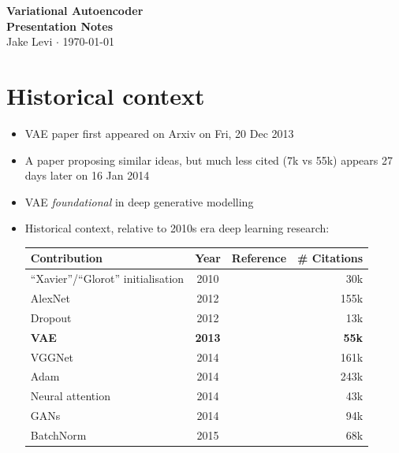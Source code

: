 \documentclass{article}
\begin{document}
\begin{center}
    \doublespacing
    \textbf{\LARGE Variational Autoencoder \\ Presentation Notes} \\
    Jake Levi $\cdot$ \today
\end{center}

\tableofcontents

\newpage
\section{Historical context}

\begin{itemize}
    \item VAE paper \cite{kingma2013auto} first appeared on Arxiv on Fri, 20 Dec 2013
    \item A paper proposing similar ideas, but much less cited (7k vs 55k) appears 27 days later on 16 Jan 2014 \cite{rezende2014stochastic}
    \item VAE \emph{foundational} in deep generative modelling
    \item Historical context, relative to 2010s era deep learning research:
    \begin{center}
        \begin{tabular}{l c l r}
            \hline
            \textbf{Contribution} & \textbf{Year} & \textbf{Reference} & \textbf{\# Citations} \\
            \hline
            ``Xavier''/``Glorot'' initialisation & 2010 & \cite{glorot2010understanding} & 30k \\
            AlexNet & 2012 & \cite{krizhevsky2012imagenet} & 155k \\
            Dropout & 2012 & \cite{hinton2012improving} & 13k \\
            \hline
            \hline
            \textbf{VAE} & \textbf{2013} & \textbf{\cite{kingma2013auto}} & \textbf{55k} \\
            \hline
            \hline
            VGGNet & 2014 & \cite{simonyan2014very} & 161k \\
            Adam & 2014 & \cite{kingma2014adam} & 243k \\
            Neural attention & 2014 & \cite{bahdanau2014neural} & 43k \\
            GANs & 2014 & \cite{goodfellow2014generative} & 94k \\
            BatchNorm & 2015 & \cite{ioffe2015batch} & 68k \\

\end{tabular}
\end{center}
\end{itemize}
\end{document}
